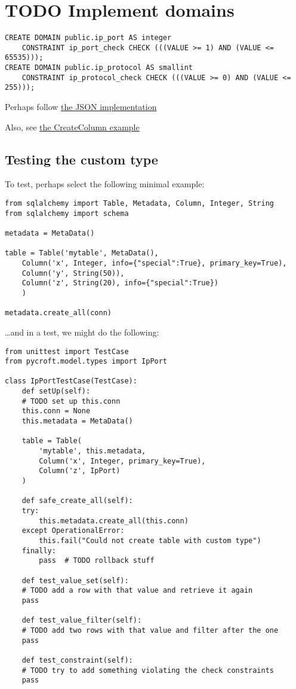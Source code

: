 \documentclass[11pt]{article}
\begin{document}
\section{{\bfseries\sffamily TODO} Implement domains}
\label{sec:org4b447a0}

\begin{verbatim}
CREATE DOMAIN public.ip_port AS integer
	CONSTRAINT ip_port_check CHECK (((VALUE >= 1) AND (VALUE <= 65535)));
CREATE DOMAIN public.ip_protocol AS smallint
	CONSTRAINT ip_protocol_check CHECK (((VALUE >= 0) AND (VALUE <= 255)));
\end{verbatim}

Perhaps follow \href{https://github.com/zzzeek/sqlalchemy/blob/master/lib/sqlalchemy/dialects/postgresql/json.py\#L71}{the JSON implementation}

Also, see \href{https://docs.sqlalchemy.org/en/13/core/ddl.html\#sqlalchemy.schema.CreateColumn}{the CreateColumn example}

\subsection{Testing the custom type}
\label{sec:org0651d3e}
To test, perhaps select the following minimal example:

\begin{verbatim}
from sqlalchemy import Table, Metadata, Column, Integer, String
from sqlalchemy import schema

metadata = MetaData()

table = Table('mytable', MetaData(),
	Column('x', Integer, info={"special":True}, primary_key=True),
	Column('y', String(50)),
	Column('z', String(20), info={"special":True})
    )

metadata.create_all(conn)
\end{verbatim}

…and in a test, we might do the following:

\begin{verbatim}
from unittest import TestCase
from pycroft.model.types import IpPort

class IpPortTestCase(TestCase):
    def setUp(self):
	# TODO set up this.conn
	this.conn = None
	this.metadata = MetaData()

	table = Table(
	    'mytable', this.metadata,
	    Column('x', Integer, primary_key=True),
	    Column('z', IpPort)
	)

    def safe_create_all(self):
	try:
	    this.metadata.create_all(this.conn)
	except OperationalError:
	    this.fail("Could not create table with custom type")
	finally:
	    pass  # TODO rollback stuff

    def test_value_set(self):
	# TODO add a row with that value and retrieve it again
	pass

    def test_value_filter(self):
	# TODO add two rows with that value and filter after the one
	pass

    def test_constraint(self):
	# TODO try to add something violating the check constraints
	pass
\end{verbatim}
\end{document}
